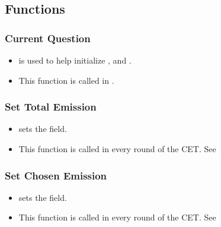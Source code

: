 \documentclass[letterpaper,10pt,english]{sphinxmanual}
\begin{document}
\subsection{Functions}
\label{\detokenize{Player_fields:functions}}

\subsubsection{Current Question}
\label{\detokenize{Player_fields:current-question}}\begin{itemize}
\item {} 
 is used to help initialize ,  and .

\item {} 
This function is called in {\hyperref[\detokenize{Subsession_fields:creating-session-ref}]{}}.

\end{itemize}


\subsubsection{Set Total Emission}
\label{\detokenize{Player_fields:set-total-emission}}\begin{itemize}
\item {} 
 sets the  field.

\item {} 
This function is called in every round of the CET. See {\hyperref[\detokenize{pages:exp-page}]{}}

\end{itemize}


\subsubsection{Set Chosen Emission}
\label{\detokenize{Player_fields:set-chosen-emission}}\begin{itemize}
\item {} 
 sets the  field.

\item {} 
This function is called in every round of the CET. See {\hyperref[\detokenize{pages:exp-page}]{}}

\end{itemize}
\end{document}
